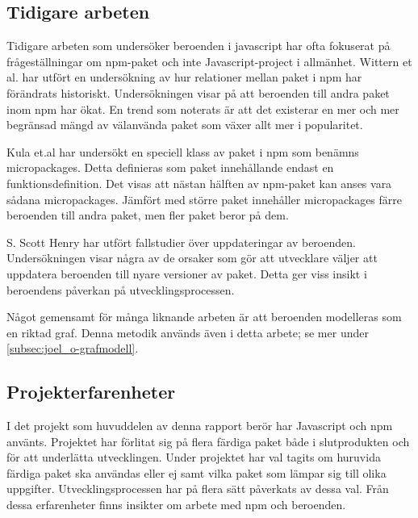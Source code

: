 \subsection{Tidigare arbeten}
Tidigare arbeten som undersöker beroenden i javascript har ofta fokuserat på frågeställningar om npm-paket och inte Javascript-project i allmänhet. Wittern et al. har utfört en undersökning av hur relationer mellan paket i npm har förändrats historiskt.\cite{Wittern:2016} Undersökningen visar på att beroenden till andra paket inom npm har ökat. En trend som noterats är att det existerar en mer och mer begränsad mängd av välanvända paket som växer allt mer i popularitet.

Kula et.al har undersökt en speciell klass av paket i npm som benämns micropackages.\cite{Kula2017} Detta definieras som paket innehållande endast en funktionsdefinition. Det visas att nästan hälften av npm-paket kan anses vara sådana micropackages. Jämfört med större paket innehåller micropackages färre beroenden till andra paket, men fler paket beror på dem.

S. Scott Henry har utfört fallstudier över uppdateringar av beroenden.\cite{Henry2017} Undersökningen visar några av de orsaker som gör att utvecklare väljer att uppdatera beroenden till nyare versioner av paket. Detta ger viss insikt i beroendens påverkan på utvecklingsprocessen.

Något gemensamt för många liknande arbeten är att beroenden modelleras som en riktad graf. Denna metodik används även i detta arbete; se mer under \ref{subsec:joel_o-grafmodell}.

\subsection{Projekterfarenheter}
I det projekt som huvuddelen av denna rapport berör har Javascript och npm använts. Projektet har förlitat sig på flera färdiga paket både i slutprodukten och för att underlätta utvecklingen. Under projektet har val tagits om huruvida färdiga paket ska användas eller ej samt vilka paket som lämpar sig till olika uppgifter. Utvecklingsprocessen har på flera sätt påverkats av dessa val. Från dessa erfarenheter finns insikter om arbete med npm och beroenden.
